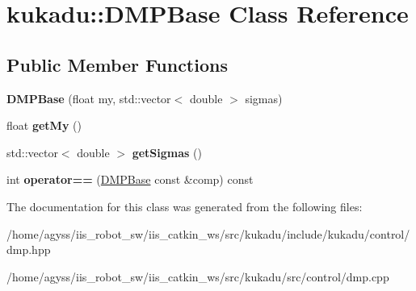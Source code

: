 \hypertarget{classkukadu_1_1DMPBase}{}\section{kukadu\+:\+:D\+M\+P\+Base Class Reference}
\label{classkukadu_1_1DMPBase}
\subsection*{Public Member Functions}
\begin{DoxyCompactItemize}
\item 
{\bfseries D\+M\+P\+Base} (float my, std\+::vector$<$ double $>$ sigmas)\hypertarget{classkukadu_1_1DMPBase_a4a752a432b73e33eb50ab35b6109872c}{}\label{classkukadu_1_1DMPBase_a4a752a432b73e33eb50ab35b6109872c}

\item 
float {\bfseries get\+My} ()\hypertarget{classkukadu_1_1DMPBase_a2b25a18ef07e4c2202246aa1f142b0b7}{}\label{classkukadu_1_1DMPBase_a2b25a18ef07e4c2202246aa1f142b0b7}

\item 
std\+::vector$<$ double $>$ {\bfseries get\+Sigmas} ()\hypertarget{classkukadu_1_1DMPBase_af65d964c6a5ecd9f22961cbad41bc847}{}\label{classkukadu_1_1DMPBase_af65d964c6a5ecd9f22961cbad41bc847}

\item 
int {\bfseries operator==} (\hyperlink{classkukadu_1_1DMPBase}{D\+M\+P\+Base} const \&comp) const \hypertarget{classkukadu_1_1DMPBase_abf6e42c62e3d1dc00009b0576c85608e}{}\label{classkukadu_1_1DMPBase_abf6e42c62e3d1dc00009b0576c85608e}

\end{DoxyCompactItemize}


The documentation for this class was generated from the following files\+:\begin{DoxyCompactItemize}
\item 
/home/agyss/iis\+\_\+robot\+\_\+sw/iis\+\_\+catkin\+\_\+ws/src/kukadu/include/kukadu/control/dmp.\+hpp\item 
/home/agyss/iis\+\_\+robot\+\_\+sw/iis\+\_\+catkin\+\_\+ws/src/kukadu/src/control/dmp.\+cpp\end{DoxyCompactItemize}
